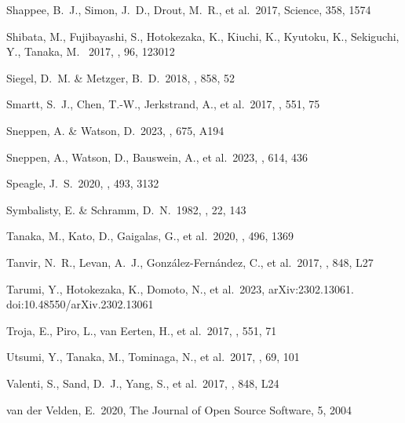 \documentclass[twocolumn,twocolappendix]{aastex63}
\begin{document}
{{{{{{{{\begin{thebibliography}{}
 Shappee, B.~J., Simon, J.~D., Drout, M.~R., et al.\ 2017, Science, 358, 1574


 Shibata, M., Fujibayashi, S., Hotokezaka, K., Kiuchi, K., Kyutoku, K., Sekiguchi, Y., Tanaka, M. \ 2017, \prd, 96, 123012


 Siegel, D.~M. \& Metzger, B.~D.\ 2018, \apj, 858, 52


 Smartt, S.~J., Chen, T.-W., Jerkstrand, A., et al.\ 2017, \nat, 551, 75


 Sneppen, A. \& Watson, D.\ 2023, \aap, 675, A194


 Sneppen, A., Watson, D., Bauswein, A., et al.\ 2023, \nat, 614, 436


 Speagle, J.~S.\ 2020, \mnras, 493, 3132

 Symbalisty, E. \& Schramm, D.~N.\ 1982, \aplett, 22, 143


 Tanaka, M., Kato, D., Gaigalas, G., et al.\ 2020, \mnras, 496, 1369


 Tanvir, N.~R., Levan, A.~J., Gonz{\'a}lez-Fern{\'a}ndez, C., et al.\ 2017, \apjl, 848, L27


 Tarumi, Y., Hotokezaka, K., Domoto, N., et al.\ 2023, arXiv:2302.13061. doi:10.48550/arXiv.2302.13061


 Troja, E., Piro, L., van Eerten, H., et al.\ 2017, \nat, 551, 71


 Utsumi, Y., Tanaka, M., Tominaga, N., et al.\ 2017, \pasj, 69, 101


 Valenti, S., Sand, D.~J., Yang, S., et al.\ 2017, \apjl, 848, L24


 van der Velden, E.\ 2020, The Journal of Open Source Software, 5, 2004



\end{thebibliography}}}}}}}}}
\end{document}
